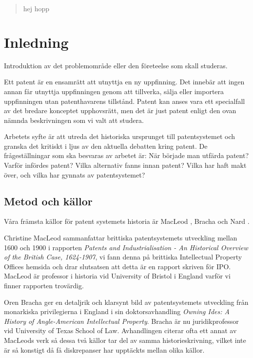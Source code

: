 
\begin{abstract}
	hej hopp
\end{abstract}	
	
	
\section{Inledning}

Introduktion av det problemområde eller den företeelse som skall studeras. 

Ett patent är en ensamrätt att utnyttja en ny uppfinning. Det innebär att ingen
annan får utnyttja uppfinningen genom att tillverka, sälja eller importera 
uppfinningen utan patenthavarens tillstånd. Patent kan anses vara ett
specialfall av det bredare konceptet upphovsrätt, men det är just patent enligt
den ovan nämnda beskrivningen som vi valt att studera.

Arbetets syfte är att utreda det historiska ursprunget till patentsystemet och
granska det kritiskt i ljus av den aktuella debatten kring patent.
De frågeställningar som ska besvaras av arbetet är: När började man utfärda
patent? Varför infördes patent? Vilka alternativ fanns innan patent?
Vilka har haft makt över, och vilka har gynnats av patentsystemet?

\subsection{Metod och källor}

Våra främsta källor för patent systemets historia är MacLeod \cite{macleod}, Bracha \cite{bracha} och Nard
\cite{nard}.

Christine MacLeod sammanfattar brittiska patentsystemets utveckling mellan 
1600 och 1900 i rapporten \emph{Patents and Industrialisation - An Historical 
Overview of the British Case, 1624-1907}, vi fann denna på brittiska 
Intellectual Property Offices hemsida och drar slutsatsen att detta är en 
rapport skriven för IPO. MacLeod är professor i historia vid University of 
Bristol i England varför vi finner rapporten trovärdig.

Oren Bracha ger en detaljrik och klarsynt bild av patentsystemets utveckling 
från monarkiska privilegierna i England i sin doktorsavhandling \emph{Owning 
Ides: A History of Angle-American Intellectual Property}. Bracha är nu 
juridikprofessor vid University of Texas School of Law. Avhandlingen citerar 
ofta ett annat av MacLeods verk så dessa två källor tar del av samma 
historieskrivning, vilket inte är så konstigt då få diskrepanser har upptäckts 
mellan olika källor.

